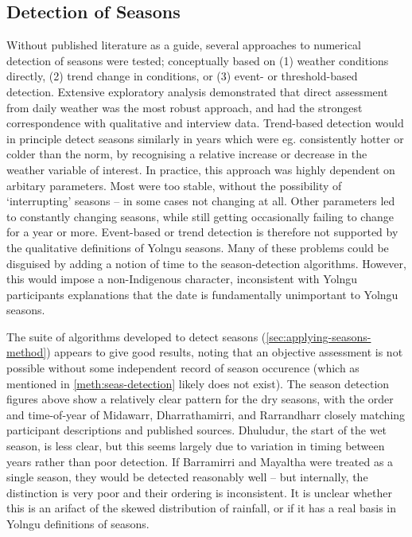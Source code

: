 \subsection{Detection of Seasons}
\label{subsec:disc-season-detection}

Without published literature as a guide, several approaches to numerical
detection of seasons were tested; conceptually based on (1) weather conditions
directly, (2) trend change in conditions, or (3) event- or threshold-based
detection.  Extensive exploratory analysis demonstrated that direct assessment
from daily weather was the most robust approach, and had the strongest
correspondence with qualitative and interview data.
%
Trend-based detection would in principle detect seasons similarly in years
which were eg. consistently hotter or colder than the norm, by recognising
a relative increase or decrease in the weather variable of interest.
In practice, this approach was highly dependent on arbitary parameters.
Most were too stable, without the possibility of `interrupting' seasons --
in some cases not changing at all.  Other parameters led to constantly
changing seasons, while still getting occasionally failing to change for a
year or more.  Event-based or trend detection is therefore not supported by
the qualitative definitions of Yolngu seasons.
%
Many of these problems could be disguised by adding a notion of time to the
season-detection algorithms.  However, this would impose a non-Indigenous
character, inconsistent with Yolngu participants explanations that the date
is fundamentally unimportant to Yolngu seasons.


The suite of algorithms developed to detect seasons (\cref{sec:applying-seasons-method})
appears to give good results, noting that an objective assessment is not
possible without some independent record of season occurence (which as
mentioned in \cref{meth:seas-detection} likely does not exist).
%
The season detection figures above show a relatively clear pattern for the
dry seasons, with the order and time-of-year of Midawarr, Dharrathamirri, and
Rarrandharr closely matching participant descriptions and published sources.
Dhuludur, the start of the wet season, is less clear, but this seems largely due to variation in timing between
years rather than poor detection.  If Barramirri and Mayaltha were treated as
a single season, they would be detected reasonably well -- but internally,
the distinction is very poor and their ordering is inconsistent. It is unclear
whether this is an arifact of the skewed distribution of rainfall,
or if it has a real basis in Yolngu definitions of seasons.


